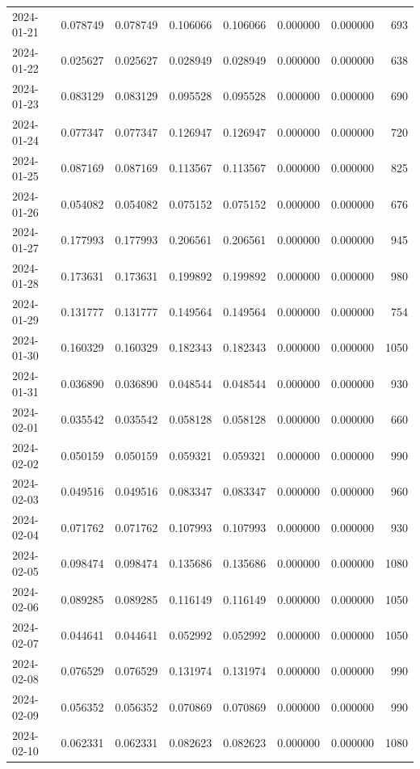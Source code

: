 \begin{tabular}{lrrrrrrr}
2024-01-21 & 0.078749 & 0.078749 & 0.106066 & 0.106066 & 0.000000 & 0.000000 & 693 \\
2024-01-22 & 0.025627 & 0.025627 & 0.028949 & 0.028949 & 0.000000 & 0.000000 & 638 \\
2024-01-23 & 0.083129 & 0.083129 & 0.095528 & 0.095528 & 0.000000 & 0.000000 & 690 \\
2024-01-24 & 0.077347 & 0.077347 & 0.126947 & 0.126947 & 0.000000 & 0.000000 & 720 \\
2024-01-25 & 0.087169 & 0.087169 & 0.113567 & 0.113567 & 0.000000 & 0.000000 & 825 \\
2024-01-26 & 0.054082 & 0.054082 & 0.075152 & 0.075152 & 0.000000 & 0.000000 & 676 \\
2024-01-27 & 0.177993 & 0.177993 & 0.206561 & 0.206561 & 0.000000 & 0.000000 & 945 \\
2024-01-28 & 0.173631 & 0.173631 & 0.199892 & 0.199892 & 0.000000 & 0.000000 & 980 \\
2024-01-29 & 0.131777 & 0.131777 & 0.149564 & 0.149564 & 0.000000 & 0.000000 & 754 \\
2024-01-30 & 0.160329 & 0.160329 & 0.182343 & 0.182343 & 0.000000 & 0.000000 & 1050 \\
2024-01-31 & 0.036890 & 0.036890 & 0.048544 & 0.048544 & 0.000000 & 0.000000 & 930 \\
2024-02-01 & 0.035542 & 0.035542 & 0.058128 & 0.058128 & 0.000000 & 0.000000 & 660 \\
2024-02-02 & 0.050159 & 0.050159 & 0.059321 & 0.059321 & 0.000000 & 0.000000 & 990 \\
2024-02-03 & 0.049516 & 0.049516 & 0.083347 & 0.083347 & 0.000000 & 0.000000 & 960 \\
2024-02-04 & 0.071762 & 0.071762 & 0.107993 & 0.107993 & 0.000000 & 0.000000 & 930 \\
2024-02-05 & 0.098474 & 0.098474 & 0.135686 & 0.135686 & 0.000000 & 0.000000 & 1080 \\
2024-02-06 & 0.089285 & 0.089285 & 0.116149 & 0.116149 & 0.000000 & 0.000000 & 1050 \\
2024-02-07 & 0.044641 & 0.044641 & 0.052992 & 0.052992 & 0.000000 & 0.000000 & 1050 \\
2024-02-08 & 0.076529 & 0.076529 & 0.131974 & 0.131974 & 0.000000 & 0.000000 & 990 \\
2024-02-09 & 0.056352 & 0.056352 & 0.070869 & 0.070869 & 0.000000 & 0.000000 & 990 \\
2024-02-10 & 0.062331 & 0.062331 & 0.082623 & 0.082623 & 0.000000 & 0.000000 & 1080 \\

\end{tabular}
